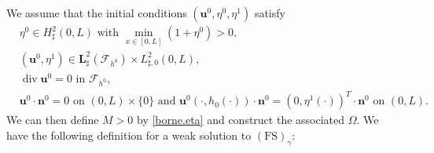 \documentclass[10pt]{amsart}
\let\mathcal\mathscr
\newcommand{\FS}{\mathrm{FS}}
\theoremstyle{remark}
\theoremstyle{definition}
\newcommand{\ug}{\boldsymbol{u}}
\DeclareMathOperator{\DIV}{div}
\newcommand{\BS}[1]{\boldsymbol{#1}}
\let\CM\Omega
\begin{document}
We assume that the initial conditions $(\ug^{0},\eta^{0},\eta^{1})$ satisfy\vspace*{-3pt}
\begin{align}
&\eta^{0}\in H^{2}_{\sharp}(0,L) \text{ with }\min_{x\in [0,L]}(1+\eta^{0})>0,\label{CI1}\\
&(\ug^0,\eta^{1})\in \BS{L}_\sharp^{2}(\mathcal{F}_{h^{0}})\times L_{\sharp, 0}^{2}(0,L),\label{CI2}\\
& \DIV{\ug^{0}}=0 \text{ in }\mathcal{F}_{h^{0}},\label{CI3}\\
&\ug^{0}\cdot \BS{n}^0 = 0 \text{ on } (0, L)\times \{0\} \text{ and } \ug^{0}(\cdot, h_0(\cdot))\cdot \BS{n}^0= (0, \eta^{1}(\cdot) )^T\cdot \BS{n}^0\text{ on }(0, L).\label{CI4}
\end{align}
We can then define $M>0$ by \eqref{borne.eta} and construct the associated $\CM$.
We have the following definition for a weak solution to $(\FS)_{\gamma}$:
\end{document}
